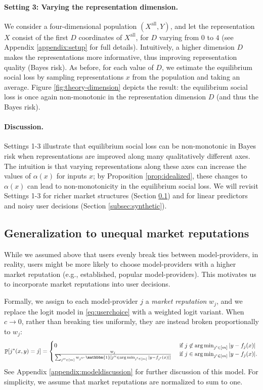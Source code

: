 \documentclass[letterpaper,11pt]{article}
\theoremstyle{plain}
\DeclareMathOperator*{\argmin}{arg\,min}
\DeclareMathOperator*{\Prob}{\mathbb{P}}
\begin{document}
\paragraph{Setting 3: Varying the representation dimension.} We consider a four-dimensional population $(X^{\text{all}}, Y)$, and let the representation $X$ consist of the first $D$ coordinates of $X^{\text{all}}$, for $D$ varying from $0$ to $4$ (see Appendix \ref{appendix:setup} for full details). Intuitively, a higher dimension $D$ makes the representations more informative, thus improving representation quality (Bayes risk). As before, for each value of $D$, we estimate the equilibrium social loss by sampling representations $x$ from the population and taking an average. Figure \ref{fig:theory-dimension} depicts the result: the equilibrium social loss is once again non-monotonic in the representation dimension $D$ (and thus the Bayes risk). 

\paragraph{Discussion.} 
Settings 1-3 illustrate that equilibrium social loss can be non-monotonic in Bayes risk when representations are improved along many qualitatively different axes. The intuition is that varying representations along these axes can increase the values of $\alpha(x)$ for inputs $x$; by Proposition \ref{prop:idealized}, these changes to $\alpha(x)$ can lead to non-monotonicity in the equilibrium social loss. We will revisit Settings 1-3 for richer market structures (Section \ref{subsec:unequal}) and for linear predictors and noisy user decisions (Section \ref{subsec:synthetic}). 

\subsection{Generalization to unequal market reputations}\label{subsec:unequal}
While we assumed above that users evenly break ties between model-providers, in reality, users might be more likely to choose model-providers with a higher market reputation (e.g., established, popular model-providers). This motivates us to incorporate market reputations into user decisions. 

Formally, we assign to each model-provider $j$ a \textit{market reputation} $w_j$, and we replace the logit model in \eqref{eq:userchoice} with a {weighted} logit variant. 
When $c\to 0$, rather than breaking ties uniformly, they are instead broken proportionally to $w_j$: 
\begin{equation}
    \label{eq:userdecisionsmr}
    \Prob[j^*(x,y) = j] = 
\begin{cases}
0 & \text{ if } j \not\in \argmin_{j' \in [m]} |y-f_j(x)| \\
\frac{w_j}{\sum_{j'' \in [m]} w_{j''} \cdot \mathbbm{1}[j'' \in \argmin_{j' \in [m]} |y-f_{j'}(x)|]}
& \text{ if } j \in \argmin_{j' \in [m]} |y-f_j(x)|.
\end{cases}
\end{equation} 
See Appendix \ref{appendix:modeldiscussion} for further discussion of this model. For simplicity, we assume that market reputations are normalized to sum to one. 
\end{document}
